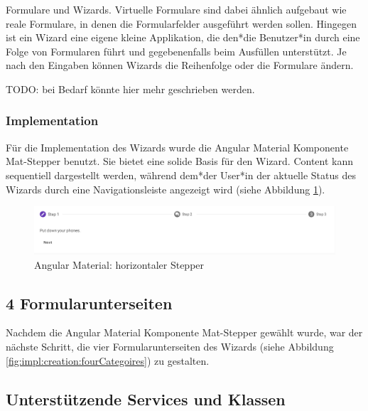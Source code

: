 Formulare und Wizards. Virtuelle Formulare sind dabei ähnlich aufgebaut wie reale Formulare, in denen die Formularfelder ausgeführt werden sollen. Hingegen ist ein Wizard eine eigene kleine Applikation, die den*die Benutzer*in durch eine Folge von Formularen führt und gegebenenfalls beim Ausfüllen unterstützt. Je nach den Eingaben können Wizards die Reihenfolge oder die Formulare ändern.

TODO: bei Bedarf könnte hier mehr geschrieben werden. \cite[Wizards: Definition and Design Recommendations]{WizradsDefinitionAndRecommandation}

\subsubsection{Implementation}
Für die Implementation des Wizards wurde die Angular Material Komponente Mat-Stepper benutzt. Sie bietet eine solide Basis für den Wizard. Content kann sequentiell dargestellt werden, während dem*der User*in der aktuelle Status des Wizards durch eine Navigationsleiste angezeigt wird (siehe Abbildung \ref{fig:impl:creation:mathorziontalstepper}). \cite{amStepper}

\begin{figure}[h t]
    \centering
    \includegraphics[scale=0.5]{pics/mathorziontalstepper.png}
    \caption{Angular Material: horizontaler Stepper \cite{amStepper}}
    \label{fig:impl:creation:mathorziontalstepper}
\end{figure}

\subsection{4 Formularunterseiten}
Nachdem die Angular Material Komponente Mat-Stepper gewählt wurde, war der nächste Schritt, die vier Formularunterseiten des Wizards (siehe Abbildung \ref{fig:impl:creation:fourCategoires}) zu gestalten.


\subsection{Unterstützende Services und Klassen}